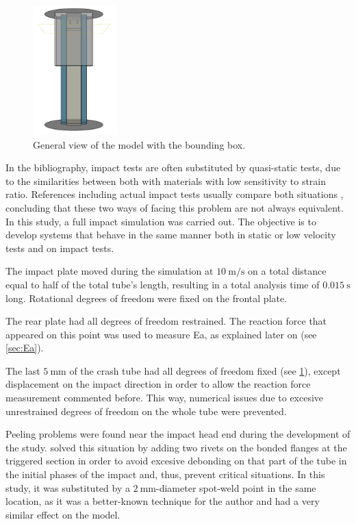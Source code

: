 \documentclass[cmfonts]{witpress}
\begin{document}
\begin{figure}[htpb]
	\centering
	\includegraphics[height=5cm]{figures/IMG_CUTRES/general_transp}
	\caption{General view of the model with the bounding box.}
	\label{fig:general}
\end{figure}

In the bibliography, impact tests are often substituted by quasi-static tests, due to the similarities between both with materials with low sensitivity to strain ratio. References including actual impact tests usually compare both situations \cite{Goglio2008, Peroni2009}, concluding that these two ways of facing this problem are not always equivalent. In this study, a full impact simulation was carried out. The objective is to develop systems that behave in the same manner both in static or low velocity tests and on impact tests.

The impact plate moved during the simulation at $\SI{10}{\m/\s}$ on a total distance equal to half of the total tube's length, resulting in a total analysis time of $\SI{0.015}{\s}$ long. Rotational degrees of freedom were fixed on the frontal plate.

The rear plate had all degrees of freedom restrained. The reaction force that appeared on this point was used to measure Ea, as explained later on (see \cref{sec:Ea}).

The last $\SI{5}{\mm}$ of the crash tube had all degrees of freedom fixed (see \cref{fig:general}), except displacement on the impact direction in order to allow the reaction force measurement commented before. This way, numerical issues due to excesive unrestrained degrees of freedom on the whole tube were prevented.


Peeling problems were found near the impact head end during the development of the study. \cite{Peroni2009} solved this situation by adding two rivets on the bonded flanges at the triggered section in order to avoid excesive debonding on that part of the tube in the initial phases of the impact and, thus, prevent critical situations. In this study, it was substituted by a $\SI{2}{\mm}$-diameter spot-weld point in the same location, as it was a better-known technique for the author and had a very similar effect on the model.
\end{document}
